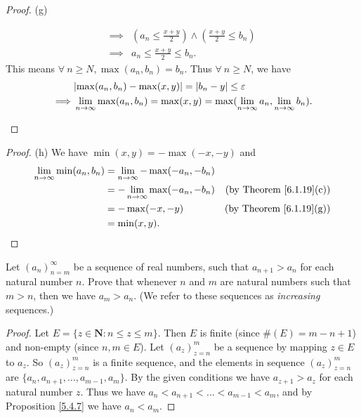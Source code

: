 \begin{proof}{(g)}
\begin{itemize}
\begin{align*}
                  \implies & (a_n \leq \frac{x + y}{2}) \land (\frac{x + y}{2} \leq b_n)                                                     \\
                  \implies & a_n \leq \frac{x + y}{2} \leq b_n.
              \end{align*}
              This means \(\forall\ n \geq N, \max(a_n, b_n) = b_n\).
              Thus \(\forall\ n \geq N\), we have
              \begin{align*}
                           & \abs*{\max(a_n, b_n) - \max(x, y)} = \abs*{b_n - y} \leq \varepsilon                                      \\
                  \implies & \lim_{n \to \infty} \max(a_n, b_n) = \max(x, y) = \max(\lim_{n \to \infty} a_n, \lim_{n \to \infty} b_n).
              \end{align*}
    \end{itemize}
\end{proof}

\begin{proof}{(h)}
    We have \(\min(x, y) = -\max(-x, -y)\) and
    \begin{align*}
        \lim_{n \to \infty} \min(a_n, b_n) & = \lim_{n \to \infty} -\max(-a_n, -b_n)                                       \\
                                           & = -\lim_{n \to \infty} \max(-a_n, -b_n) & \text{(by Theorem \ref{6.1.19}(c))} \\
                                           & = -\max(-x, -y)                         & \text{(by Theorem \ref{6.1.19}(g))} \\
                                           & = \min(x, y).
    \end{align*}
\end{proof}

\exercisesection

\begin{exercise}\label{ex 6.1.1}
    Let \((a_n)_{n = m}^\infty\) be a sequence of real numbers, such that \(a_{n + 1} > a_n\) for each natural number \(n\).
    Prove that whenever \(n\) and \(m\) are natural numbers such that \(m > n\), then we have \(a_m > a_n\).
    (We refer to these sequences as \emph{increasing} sequences.)
\end{exercise}

\begin{proof}
    Let \(E = \{z \in \mathbf{N} : n \leq z \leq m\}\).
    Then \(E\) is finite (since \(\#(E) = m - n + 1\)) and non-empty (since \(n, m \in E\)).
    Let \((a_z)_{z = n}^m\) be a sequence by mapping \(z \in E\) to \(a_z\).
    So \((a_z)_{z = n}^m\) is a finite sequence, and the elements in sequence \((a_z)_{z = n}^m\) are \(\{a_n, a_{n + 1}, \dots, a_{m - 1}, a_m\}\).
    By the given conditions we have \(a_{z + 1} > a_z\) for each natural number \(z\).
    Thus we have \(a_n < a_{n + 1} < \dots < a_{m - 1} < a_m\), and by Proposition \ref{5.4.7} we have \(a_n < a_m\).
\end{proof}

